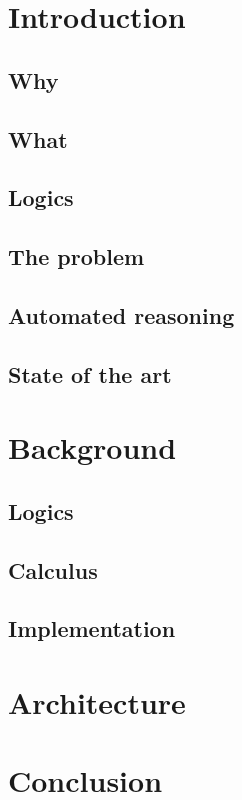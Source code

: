 \documentclass[a4paper, 11pt, oneside]{article}
\begin{document}
\newpage



\chapter{Introduction}
\section{Why}
\section{What}
\section{Logics}
\section{The problem}
\section{Automated reasoning}
\section{State of the art}

\chapter{Background}
\section{Logics}
\section{Calculus}
\section{Implementation}

\chapter{Architecture}

\chapter{Conclusion}


\nocite{*}
{}

\end{document}
